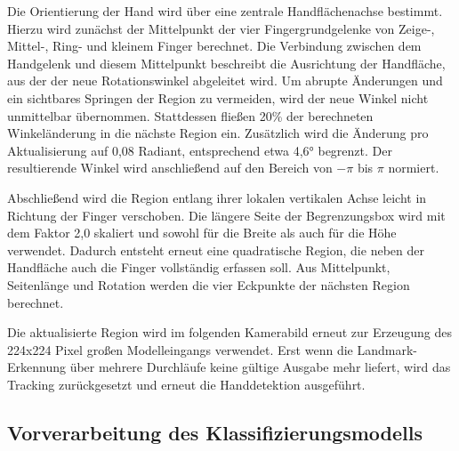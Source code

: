 Die Orientierung der Hand wird über eine zentrale Handflächenachse bestimmt. Hierzu wird zunächst der Mittelpunkt der vier Fingergrundgelenke von Zeige-, Mittel-, Ring- und kleinem Finger berechnet. Die Verbindung zwischen dem Handgelenk und diesem Mittelpunkt beschreibt die Ausrichtung der Handfläche, aus der der neue Rotationswinkel abgeleitet wird. Um abrupte Änderungen und ein sichtbares Springen der Region zu vermeiden, wird der neue Winkel nicht unmittelbar übernommen. Stattdessen fließen 20\% der berechneten Winkeländerung in die nächste Region ein. Zusätzlich wird die Änderung pro Aktualisierung auf 0,08 Radiant, entsprechend etwa 4,6° begrenzt. Der resultierende Winkel wird anschließend auf den Bereich von $-\pi$ bis $\pi$ normiert.

Abschließend wird die Region entlang ihrer lokalen vertikalen Achse leicht in Richtung der Finger verschoben. Die längere Seite der Begrenzungsbox wird mit dem Faktor 2,0 skaliert und sowohl für die Breite als auch für die Höhe verwendet. Dadurch entsteht erneut eine quadratische Region, die neben der Handfläche auch die Finger vollständig erfassen soll. Aus Mittelpunkt, Seitenlänge und Rotation werden die vier Eckpunkte der nächsten Region berechnet.

Die aktualisierte Region wird im folgenden Kamerabild erneut zur Erzeugung des 224x224 Pixel großen Modelleingangs verwendet. Erst wenn die Landmark-Erkennung über mehrere Durchläufe keine gültige Ausgabe mehr liefert, wird das Tracking zurückgesetzt und erneut die Handdetektion ausgeführt.

\subsection{Vorverarbeitung des Klassifizierungsmodells}\label{sub:klassifikation-vorverarbeitung}

